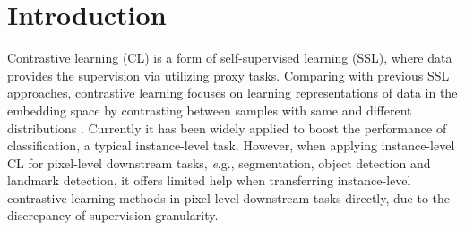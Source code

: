 \documentclass[10pt,twocolumn,letterpaper]{article}
\begin{document}
\section{Introduction}

Contrastive learning (CL) is a form of self-supervised learning (SSL), where data provides the supervision via utilizing proxy tasks. Comparing with previous SSL approaches, contrastive learning focuses on learning representations of data in the embedding space by contrasting between samples with same and different distributions \cite{}. Currently it has been widely applied to boost the performance of classification, a typical instance-level task. However, when applying instance-level CL for pixel-level downstream tasks, {\textit e.g.}, segmentation, object detection and landmark detection, it offers limited help when transferring instance-level contrastive learning methods in pixel-level downstream tasks directly, due to the discrepancy of supervision granularity. 


\end{document}
